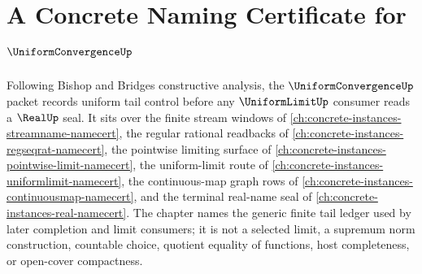 \chapter{A Concrete Naming Certificate for $\UniformConvergenceUp$}
\label{ch:concrete-instances-uniform-convergence-namecert}

Following Bishop and Bridges constructive analysis, the $\UniformConvergenceUp$ packet records uniform tail control before any $\UniformLimitUp$ consumer reads a $\RealUp$ seal. It sits over the finite stream windows of \autoref{ch:concrete-instances-streamname-namecert}, the regular rational readbacks of \autoref{ch:concrete-instances-regseqrat-namecert}, the pointwise limiting surface of \autoref{ch:concrete-instances-pointwise-limit-namecert}, the uniform-limit route of \autoref{ch:concrete-instances-uniformlimit-namecert}, the continuous-map graph rows of \autoref{ch:concrete-instances-continuousmap-namecert}, and the terminal real-name seal of \autoref{ch:concrete-instances-real-namecert}. The chapter names the generic finite tail ledger used by later completion and limit consumers; it is not a selected limit, a supremum norm construction, countable choice, quotient equality of functions, host completeness, or open-cover compactness.

